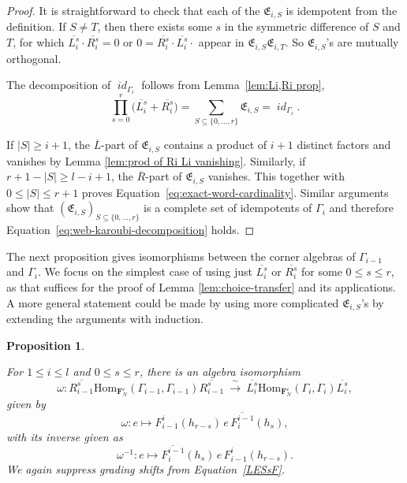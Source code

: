 \documentclass[12pt]{amsart}
\newtheorem{proposition}[theorem]{Proposition}
\theoremstyle{definition}
\theoremstyle{remark}
\numberwithin{equation}{section}
\numberwithin{figure}{section}
\newcommand{\Hom}{\mathrm{Hom}}
\newcommand{\Li}[2]{\overline{L^{#1}_{#2}}}
\newcommand{\Ri}[2]{\overline{R^{#1}_{#2}}}
\newcommand{\Foam}{\mathbf{F}_N}
\DeclareMathOperator{\idfoam}{\mathit{id}}
\begin{document}
\begin{proof}
It is straightforward to check that each of the $\mathfrak{E}_{i,S}$ is idempotent from the definition. If $S\neq T$, then there exists some $s$ in the symmetric difference of $S$ and $T$, for which $\Li{s}{i} \cdot \Ri{s}{i}=0$ or  $0 =  \Ri{s}{i}\cdot \Li{s}{i} \cdot $ appear in $\mathfrak{E}_{i,S} \mathfrak{E}_{i, T}$. So $\mathfrak{E}_{i,S}$'s are mutually orthogonal.

The decomposition of $\idfoam_{\Gamma_i}$ follows from Lemma~\ref{lem:Li,Ri prop},
\[
 \prod_{s=0}^{r}\bigl(\Li{s}{i}+\Ri{s}{i}\bigr)
 =\sum_{S\subseteq\{0,\ldots,r\}}\mathfrak{E}_{i,S}
 =\idfoam_{\Gamma_i}.
\]

If $|S|\geq i+1$, the $\overline L$-part of $\mathfrak{E}_{i,S}$ contains a product of $i+1$ distinct factors and vanishes by Lemma \ref{lem:prod of Ri Li vanishing}. Similarly, if $r+1-|S|\geq l-i+1$, the $\overline R$-part of $\mathfrak{E}_{i,S}$ vanishes. This together with $0\leq|S|\leq r+1$ proves Equation~\eqref{eq:exact-word-cardinality}. Similar arguments show that $(\mathfrak{E}_{i,S})_{S\subseteq \{0,\ldots,r\}}$ is a complete set of idempotents of $\Gamma_i$ and therefore Equation~\eqref{eq:web-karoubi-decomposition} holds.
\end{proof}

The next proposition gives isomorphisms between the corner algebras of $\Gamma_{i-1}$ and $\Gamma_i$. We focus on the simplest case of using just $\Li{s}{i}$ or $\Ri{s}{i}$ for some $0\leq s\leq r$, as that suffices for the proof of Lemma \ref{lem:choice-transfer} and its applications. A more general statement could be made by using more complicated $\mathfrak{E}_{i,S}$'s by extending the arguments with induction.

\begin{proposition}\label{prop:corner-transfer}



For $1\leq i\leq l$ and $0\leq s\leq r$, there is an 
algebra isomorphism
\[
 \omega: \Ri{s}{i-1}\Hom_{\Foam^\varepsilon}(\Gamma_{i-1},\Gamma_{i-1}) \Ri{s}{i-1}
 \ \xrightarrow{\ \sim\ }\
 \Li{s}{i}\Hom_{\Foam^\varepsilon}(\Gamma_i,\Gamma_i)\Li{s}{i},
\]
given by
\begin{equation}\label{eq:corner-transfer}
 \omega: e\longmapsto   F_{i-1}^{i}(h_{r-s})\,e\,\overline{F_i^{i-1}}(h_s),
\end{equation}
with its inverse given as
\begin{equation}\label{eq:corner-transfer-inverse}
 \omega^{-1}:e\longmapsto  \overline{F_i^{i-1}}(h_s)\,e\,F_{i-1}^{i}(h_{r-s}).
\end{equation}
We again suppress grading shifts from Equation~\eqref{LESsF}.
\end{proposition}
\end{document}
